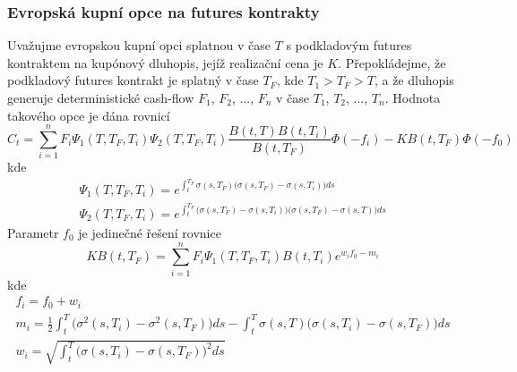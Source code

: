 \documentclass[a4paper]{book}
\begin{document}
\subsubsection{Evropská kupní opce na futures kontrakty}

Uvažujme evropskou kupní opci splatnou v čase $T$ s podkladovým futures kontraktem na kupónový dluhopis, jejíž realizační cena je $K$. Přepokládejme, že podkladový futures kontrakt je splatný v čase $T_F$, kde $T_1 > T_F > T$, a že dluhopis generuje deterministické cash-flow $F_1$, $F_2$, ..., $F_n$ v čase $T_1$, $T_2$, ..., $T_n$. Hodnota takového opce je dána rovnicí
\begin{equation*}
C_t = \sum_{i=1}^n F_i \Psi_1(T, T_F, T_i)\Psi_2(T, T_F, T_i) \frac{B(t,T)B(t, T_i)}{B(t, T_F)} \Phi(-f_i) - K B(t, T_F)\Phi(-f_0)
\end{equation*}
kde
\begin{gather*}
\Psi_1(T, T_F, T_i) = e^{\int_t^{T_F} \sigma(s, T_F) \big( \sigma(s, T_F) - \sigma(s, T_i) \big)ds}\\
\Psi_2(T, T_F, T_i) = e^{\int_t^{T_F} \big( \sigma(s, T_F) - \sigma(s, T_i) \big) \big( \sigma(s, T_F) - \sigma(s, T)\big)ds}
\end{gather*}
Parametr $f_0$ je jedinečné řešení rovnice
\begin{equation*}
KB(t, T_F) = \sum_{i=1}^n F_i \Psi_1(T, T_F, T_i) B(t, T_i) e^{w_i f_0 - m_i}
\end{equation*}
kde
\begin{gather*}
f_i = f_0 + w_i\\
m_i = \frac{1}{2} \int_t^T \big( \sigma^2(s,T_i) - \sigma^2(s, T_F) \big)ds - \int_t^T \sigma(s,T)\big( \sigma(s,T_i) - \sigma(s, T_F) \big)ds\\
w_i = \sqrt{\int_t^T \big( \sigma(s, T_i) - \sigma(s, T_F)\big)^2 ds}
\end{gather*}
\end{document}
